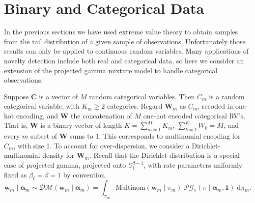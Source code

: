 \section{Binary and Categorical Data\label{sec:categorical}}
In the previous sections we have used extreme value theory to obtain samples
    from the tail distribution of a given sample of observations. Unfortunately 
    those results can only be applied to continuous random variables.  Many 
    applications of novelty detection include both real and categorical 
    data, so here we consider an extension of the projected gamma mixture model 
    to handle categorical observations. 

Suppose $\bm{C}$ is a vector of $M$ random categorical variables.  Then $C_m$ 
    is a random categorical variable, with $K_{m} \geq 2$ categories. Regard 
    $\bm{W}_m$ as $C_m$, recoded in one-hot encoding, and $\bm{W}$ the 
    concatenation of $M$ one-hot encoded categorical RV's. That is, $\bm{W}$ 
    is a binary vector of length $K = \sum_{m = 1}^M K_{m}$, 
    $\sum_{k = 1}^K W_k = M$, and every $m$ subset of $\bm{W}$ sums to 1.  This 
    corresponds to multinomial encoding for $C_m$, with size 1. To account for
    over-dispersion, we consider a Dirichlet-multinomial density for $\bm{W}_m$.
    Recall that the Dirichlet distribution is a special case of projected gamma,
    projected onto $\mathbb{S}_1^{d-1}$, with rate parameters uniformly fixed
    as $\beta_{\ell} = \beta = 1$ by convention. 
    \begin{equation}
        \label{eqn:dirmultinom}
        \bm{w}_{m}\mid\bm{\alpha}_m 
        \sim 
        \mathcal{DM}(\bm{w}_m\mid\bm{\alpha}_m) =
        \int_{\pi_{m}} 
        \text{Multinom}(\bm{w}_{m}\mid\pi_{m})\;
        \mathcal{PG}_1(\pi\mid\bm{\alpha}_m,\bm{1})\;\text{d}\pi_{m}.
    \end{equation}
